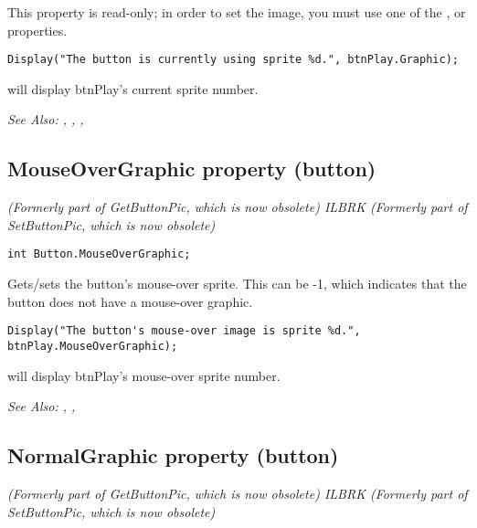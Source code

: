 This property is read-only; in order to set the image, you must use one of the
,
 or
 properties.

\begin{verbatim}
Display("The button is currently using sprite %d.", btnPlay.Graphic);
\end{verbatim}
will display btnPlay's current sprite number.

\it{See Also:} ,
,
,


\subsection{MouseOverGraphic property (button)}\label{Button.MouseOverGraphic}%

\it{(Formerly part of GetButtonPic, which is now obsolete)} ILBRK
\it{(Formerly part of SetButtonPic, which is now obsolete)}

\begin{verbatim}
int Button.MouseOverGraphic;
\end{verbatim}
Gets/sets the button's mouse-over sprite. This can be -1, which indicates that the button
does not have a mouse-over graphic.

\begin{verbatim}
Display("The button's mouse-over image is sprite %d.", btnPlay.MouseOverGraphic);
\end{verbatim}
will display btnPlay's mouse-over sprite number.

\it{See Also:} ,
,


\subsection{NormalGraphic property (button)}\label{Button.NormalGraphic}%

\it{(Formerly part of GetButtonPic, which is now obsolete)} ILBRK
\it{(Formerly part of SetButtonPic, which is now obsolete)}

